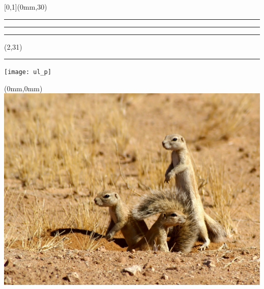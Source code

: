 
\begingroup
{}
\textblockorigin{0mm}{0mm}
\setlength{\parindent}{0mm}
\setlength{\imageheight}{29\TPVertModule}
\setlength{\banderougewidth}{2\TPHorizModule}
\setlength{\banderougeheight}{\TPVertModule}
\setlength{\bandeorwidth}{\TPHorizModule}
\setlength{\bandeorheight}{\banderougeheight}
\setlength{\logoheight}{2.5\TPVertModule}
\setlength{\gapwidth}{1.5pt}
\addtolength{\bandeorwidth}{-\gapwidth}
\addtolength{\imageheight}{-\gapwidth}

\def\titlefmt{%
  \sffamily\bfseries\fontsize{52}{52}\selectfont\thetitle}
\def\authorfmt{%
  \sffamily\mdseries\fontsize{30}{38}\selectfont\theauthor}
\def\affiliation{%
  \sffamily\mdseries\fontsize{22}{26}\selectfont
  Professeur titulaire \\
  École d'actuariat, Université Laval}
\def\edition{%
  \sffamily\mdseries\fontsize{22}{26}\selectfont
  Édition {\fullcaps\year}.\month}

\begin{textblock*}{\paperwidth}[0,1](0mm,30\TPVertModule)
  \textcolor{rouge}{\rule{\banderougewidth}{\banderougeheight}}%
  \rule{\gapwidth}{0pt}%
  \textcolor{or}{\rule{\bandeorwidth}{\bandeorheight}}           %
\end{textblock*}

\begin{textblock*}{\TPHorizModule}(2\TPHorizModule,31\TPVertModule)
  \rule{\gapwidth}{0pt}%
  \texttt{[image: ul\_p]}
\end{textblock*}

\begin{textblock*}{\paperwidth}(0mm,0mm)
  \includegraphics[height=\imageheight,%
                   width=\paperwidth,%
                   trim=555 185 251 0,clip]{Xerus_inauris_1}
\end{textblock*}


